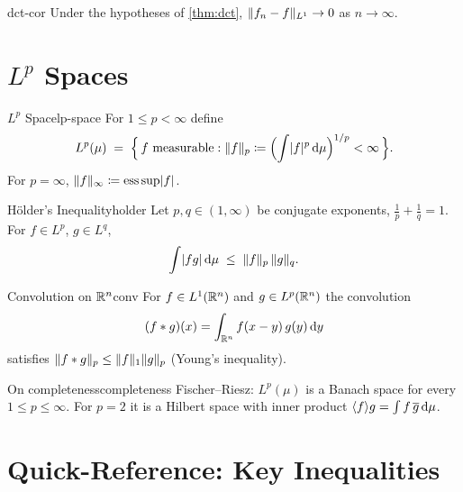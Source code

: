 \begin{corollary}{}{dct-cor}
    Under the hypotheses of \cref{thm:dct},
    $\norm{f_n - f}_{L^1} \to 0$ as $n \to \infty$.
\end{corollary}

\section{\texorpdfstring{$L^p$}{Lp} Spaces}

\begin{definition}{$L^p$ Space}{lp-space}
    For $1 \leq p < \infty$ define
    \[
        L^p(\mu) \;=\; \Bigl\{\, f \text{ measurable} :
            \norm{f}_{p} \coloneqq \Bigl(\int \abs{f}^p\dmu\Bigr)^{1/p} < \infty \,\Bigr\}.
    \]
    For $p=\infty$,\; $\norm{f}_{\infty} \coloneqq \esssup\abs{f}$.
\end{definition}

\begin{theorem}{Hölder's Inequality}{holder}
    Let $p,q\in(1,\infty)$ be conjugate exponents, $\tfrac{1}{p}+\tfrac{1}{q}=1$.
    For $f\in L^p$, $g\in L^q$,
    \[
        \int \abs{fg}\dmu \;\leq\; \norm{f}_{p}\,\norm{g}_{q}.
    \]
\end{theorem}

\begin{example}{Convolution on $\R^n$}{conv}
    For $f\in L^1(\R^n)$ and $g\in L^p(\R^n)$ the convolution
    \[
        (f*g)(x) = \int_{\R^n} f(x-y)\,g(y)\dx[y]
    \]
    satisfies $\norm{f*g}_{p} \leq \norm{f}_{1}\norm{g}_{p}$ (Young's inequality).
\end{example}

\begin{remark}{On completeness}{completeness}
    Fischer--Riesz: $L^p(\mu)$ is a Banach space for every $1\leq p\leq\infty$.
    For $p=2$ it is a Hilbert space with inner product
    $\inner{f}{g} = \int f\,\ol{g}\dmu$.
\end{remark}

\section*{Quick-Reference: Key Inequalities}

